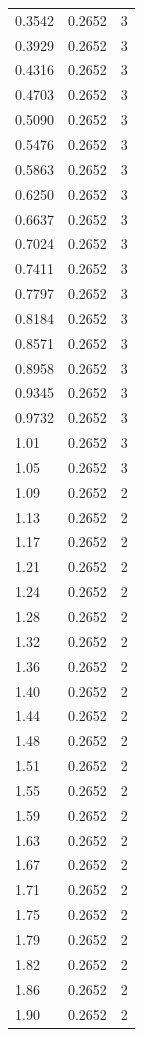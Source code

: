 \begin{longtable}{lrr}
  0.3542 & 0.2652 & 3 \\
  0.3929 & 0.2652 & 3 \\
  0.4316 & 0.2652 & 3 \\
  0.4703 & 0.2652 & 3 \\
  0.5090 & 0.2652 & 3 \\
  0.5476 & 0.2652 & 3 \\
  0.5863 & 0.2652 & 3 \\
  0.6250 & 0.2652 & 3 \\
  0.6637 & 0.2652 & 3 \\
  0.7024 & 0.2652 & 3 \\
  0.7411 & 0.2652 & 3 \\
  0.7797 & 0.2652 & 3 \\
  0.8184 & 0.2652 & 3 \\
  0.8571 & 0.2652 & 3 \\
  0.8958 & 0.2652 & 3 \\
  0.9345 & 0.2652 & 3 \\
  0.9732 & 0.2652 & 3 \\
  1.01 & 0.2652 & 3 \\
  1.05 & 0.2652 & 3 \\
  1.09 & 0.2652 & 2 \\
  1.13 & 0.2652 & 2 \\
  1.17 & 0.2652 & 2 \\
  1.21 & 0.2652 & 2 \\
  1.24 & 0.2652 & 2 \\
  1.28 & 0.2652 & 2 \\
  1.32 & 0.2652 & 2 \\
  1.36 & 0.2652 & 2 \\
  1.40 & 0.2652 & 2 \\
  1.44 & 0.2652 & 2 \\
  1.48 & 0.2652 & 2 \\
  1.51 & 0.2652 & 2 \\
  1.55 & 0.2652 & 2 \\
  1.59 & 0.2652 & 2 \\
  1.63 & 0.2652 & 2 \\
  1.67 & 0.2652 & 2 \\
  1.71 & 0.2652 & 2 \\
  1.75 & 0.2652 & 2 \\
  1.79 & 0.2652 & 2 \\
  1.82 & 0.2652 & 2 \\
  1.86 & 0.2652 & 2 \\
  1.90 & 0.2652 & 2 \\

\end{longtable}
